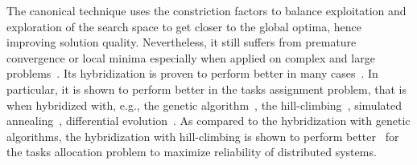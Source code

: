 The canonical \pso{} technique uses the constriction factors to balance exploitation and exploration of the search space to get closer to the global optima, hence improving solution quality. Nevertheless, it still suffers from premature convergence or local minima especially when applied on complex and large problems~\cite{Rini2011ParticleChallenges}. Its hybridization is proven to perform better in many cases~\cite{Sengupta2018ParticlePerspectives}. In particular, it is shown to perform better in the tasks assignment problem, that is when hybridized with, e.g., the genetic algorithm~\cite{Sailer2013OptimizingAUTOSAR}, the hill-climbing~\cite{yin2007task}, simulated annealing~\cite{Zhao2007ASystem}, differential evolution~\cite{Storn1997DifferentialSpaces}. As compared to the hybridization with genetic algorithms, the hybridization with hill-climbing \hcpso{} is shown to perform better~\cite{yin2007task} for the tasks allocation problem to maximize reliability of distributed systems. 

